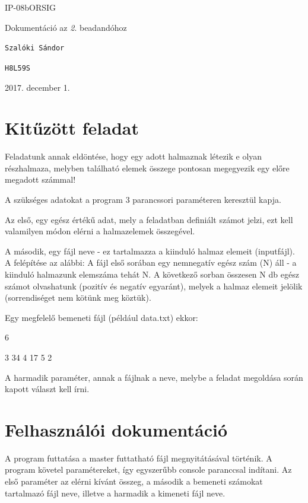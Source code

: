 \documentclass[12pt]{article}
\begin{document}
\begin{titlepage}
	\vspace*{0.5cm}
	{\normalsize IP-08bORSIG}
	
	\vspace{2cm}
	{\huge Dokumentáció az \textit{2}. beadandóhoz}
	
	\vspace*{5cm}
	
	{\large \verb|Szalóki Sándor| } %
	
	{\large \verb|H8L59S| }  %
		
	
	\vfill
	
	\vspace*{1cm}
	2017. december 1. %
\end{titlepage}

\section{Kitűzött feladat}

Feladatunk annak eldöntése, hogy egy adott halmaznak létezik e olyan részhalmaza, melyben található elemek összege pontosan megegyezik egy előre megadott számmal!

A szükséges adatokat a program 3 parancssori paraméteren keresztül kapja.

Az első, egy egész értékű adat, mely a feladatban definiált számot jelzi, ezt kell valamilyen módon elérni a halmazelemek összegével.

A második, egy fájl neve - ez tartalmazza a kiinduló halmaz elemeit (inputfájl). A felépítése az alábbi: A fájl első sorában egy nemnegatív egész szám (N) áll - a kiinduló halmazunk elemszáma tehát N. A következő sorban összesen N db egész számot olvashatunk (pozitív és negatív egyaránt), melyek a halmaz elemeit jelölik (sorrendiséget nem kötünk meg köztük).

Egy megfelelő bemeneti fájl (például data.txt) ekkor:

6

3 34 4 17 5 2

A harmadik paraméter, annak a fájlnak a neve, melybe a feladat megoldása során kapott választ kell írni.

\section{Felhasználói dokumentáció}

A program futtatása a master futtatható fájl megnyitátásával történik. A program követel paramétereket, így egyszerűbb console paranccsal indítani.
Az első paraméter az elérni kívánt összeg, a második a bemeneti számokat tartalmazó fájl neve, illetve a harmadik a kimeneti fájl neve.
\end{document}
